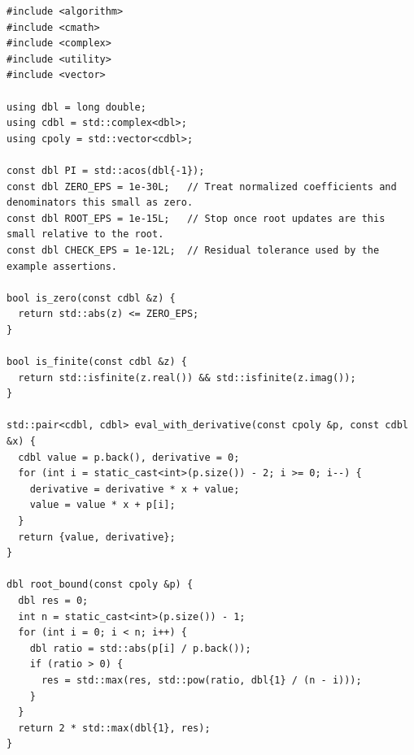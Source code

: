 \begin{lstlisting}[style=cpp]
#include <algorithm>
#include <cmath>
#include <complex>
#include <utility>
#include <vector>

using dbl = long double;
using cdbl = std::complex<dbl>;
using cpoly = std::vector<cdbl>;

const dbl PI = std::acos(dbl{-1});
const dbl ZERO_EPS = 1e-30L;   // Treat normalized coefficients and denominators this small as zero.
const dbl ROOT_EPS = 1e-15L;   // Stop once root updates are this small relative to the root.
const dbl CHECK_EPS = 1e-12L;  // Residual tolerance used by the example assertions.

bool is_zero(const cdbl &z) {
  return std::abs(z) <= ZERO_EPS;
}

bool is_finite(const cdbl &z) {
  return std::isfinite(z.real()) && std::isfinite(z.imag());
}

std::pair<cdbl, cdbl> eval_with_derivative(const cpoly &p, const cdbl &x) {
  cdbl value = p.back(), derivative = 0;
  for (int i = static_cast<int>(p.size()) - 2; i >= 0; i--) {
    derivative = derivative * x + value;
    value = value * x + p[i];
  }
  return {value, derivative};
}

dbl root_bound(const cpoly &p) {
  dbl res = 0;
  int n = static_cast<int>(p.size()) - 1;
  for (int i = 0; i < n; i++) {
    dbl ratio = std::abs(p[i] / p.back());
    if (ratio > 0) {
      res = std::max(res, std::pow(ratio, dbl{1} / (n - i)));
    }
  }
  return 2 * std::max(dbl{1}, res);
}


\end{lstlisting}
